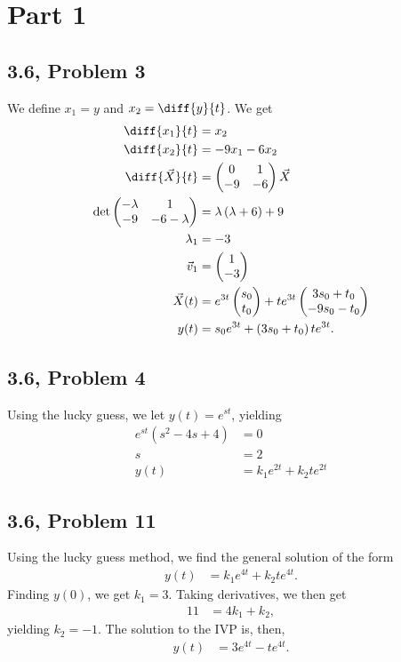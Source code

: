 \documentclass[8pt]{mypackage}
\begin{document}
\RaggedRight
\section{Part 1}%
\subsection{3.6, Problem 3}%
We define $x_1= y$ and $x_2 = \diff{y}{t}$. We get
\begin{align*}
  \diff{x_1}{t} &= x_2\\
  \diff{x_2}{t} &= -9x_1 - 6x_2\\
  \diff{\vec{X}}{t} &= \begin{pmatrix}0 & 1 \\ -9 & -6\end{pmatrix} \vec{X}\\
  \det \begin{pmatrix}-\lambda & 1 \\ -9 & -6-\lambda\end{pmatrix} &= \lambda\left(\lambda + 6\right) + 9\\
  \lambda_1 &= -3\\
  \vec{v}_1 &= \begin{pmatrix}1\\-3\end{pmatrix}\\
  \vec{X}(t) &= e^{3t} \begin{pmatrix}s_0\\t_0\end{pmatrix} + te^{3t} \begin{pmatrix}3s_0 + t_0\\-9s_0-t_0\end{pmatrix}\\
  y(t) &= s_0e^{3t} + \left(3s_0 + t_0\right)te^{3t}.
\end{align*}
\subsection{3.6, Problem 4}%
Using the lucky guess, we let $y(t) = e^{st}$, yielding
\begin{align*}
  e^{st}\left(s^2 - 4s + 4\right) &= 0\\
  s &= 2\\
  y(t) &= k_1e^{2t} + k_2te^{2t}
\end{align*}
\subsection{3.6, Problem 11}%
Using the lucky guess method, we find the general solution of the form
\begin{align*}
  y(t) &= k_1e^{4t} + k_2te^{4t}.
\end{align*}
Finding $y(0)$, we get $k_1 = 3$. Taking derivatives, we then get
\begin{align*}
  11 &= 4k_1 + k_2,
\end{align*}
yielding $k_2 = -1$. The solution to the IVP is, then,
\begin{align*}
  y(t) &= 3e^{4t} - te^{4t}.
\end{align*}
\end{document}
